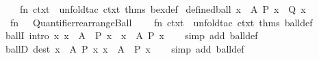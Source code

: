 \begin{isabellebody}
\ \ \ \ {\isacharparenleft}{\kern0pt}fn\ ctxt\ {\isacharequal}{\kern0pt}{\isachargreater}{\kern0pt}\ unfold{\isacharunderscore}{\kern0pt}tac\ ctxt\ {\isacharat}{\kern0pt}{\isacharbraceleft}{\kern0pt}thms\ bex{\isacharunderscore}{\kern0pt}def{\isacharbraceright}{\kern0pt}{\isacharparenright}{\kern0pt}{\isacartoucheclose}\isanewline
\isanewline
{}\isamarkupfalse%
\ defined{\isacharunderscore}{\kern0pt}ball\ {\isacharparenleft}{\kern0pt}{\isachardoublequoteopen}{\isasymforall}x\ {\isasymin}\ A{\isachardot}{\kern0pt}\ P\ x\ {\isasymlongrightarrow}\ Q\ x{\isachardoublequoteclose}{\isacharparenright}{\kern0pt}\ {\isacharequal}{\kern0pt}\isanewline
\ \ {\isacartoucheopen}fn\ {\isacharunderscore}{\kern0pt}\ {\isacharequal}{\kern0pt}{\isachargreater}{\kern0pt}\ Quantifier{}{\isachardot}{\kern0pt}rearrange{\isacharunderscore}{\kern0pt}Ball\isanewline
\ \ \ \ {\isacharparenleft}{\kern0pt}fn\ ctxt\ {\isacharequal}{\kern0pt}{\isachargreater}{\kern0pt}\ unfold{\isacharunderscore}{\kern0pt}tac\ ctxt\ {\isacharat}{\kern0pt}{\isacharbraceleft}{\kern0pt}thms\ ball{\isacharunderscore}{\kern0pt}def{\isacharbraceright}{\kern0pt}{\isacharparenright}{\kern0pt}{\isacartoucheclose}%
\endisatagML
{\isafoldML}%
%
\isadelimML
%
\endisadelimML
\isanewline
\isanewline
{}\isamarkupfalse%
\ ballI\ {\isacharbrackleft}{\kern0pt}intro{\isacharbang}{\kern0pt}{\isacharbrackright}{\kern0pt}{\isacharcolon}{\kern0pt}\ {\isachardoublequoteopen}{\isasymlbrakk}{\isasymAnd}x{\isachardot}{\kern0pt}\ x\ {\isasymin}\ A\ {\isasymLongrightarrow}\ P\ x{\isasymrbrakk}\ {\isasymLongrightarrow}\ {\isasymforall}x\ {\isasymin}\ A{\isachardot}{\kern0pt}\ P\ x{\isachardoublequoteclose}\isanewline
%
\isadelimproof
\ \ %
\endisadelimproof
%
\isatagproof
{}\isamarkupfalse%
\ {\isacharparenleft}{\kern0pt}simp\ add{\isacharcolon}{\kern0pt}\ ball{\isacharunderscore}{\kern0pt}def{\isacharparenright}{\kern0pt}%
\endisatagproof
{\isafoldproof}%
%
\isadelimproof
\isanewline
%
\endisadelimproof
\isanewline
{}\isamarkupfalse%
\ ballD\ {\isacharbrackleft}{\kern0pt}dest{\isacharquery}{\kern0pt}{\isacharbrackright}{\kern0pt}{\isacharcolon}{\kern0pt}\ {\isachardoublequoteopen}{\isasymlbrakk}{\isasymforall}x\ {\isasymin}\ A{\isachardot}{\kern0pt}\ P\ x{\isacharsemicolon}{\kern0pt}\ x\ {\isasymin}\ A{\isasymrbrakk}\ {\isasymLongrightarrow}\ P\ x{\isachardoublequoteclose}\isanewline
%
\isadelimproof
\ \ %
\endisadelimproof
%
\isatagproof
{}\isamarkupfalse%
\ {\isacharparenleft}{\kern0pt}simp\ add{\isacharcolon}{\kern0pt}\ ball{\isacharunderscore}{\kern0pt}def{\isacharparenright}{\kern0pt}%

\end{isabellebody}
